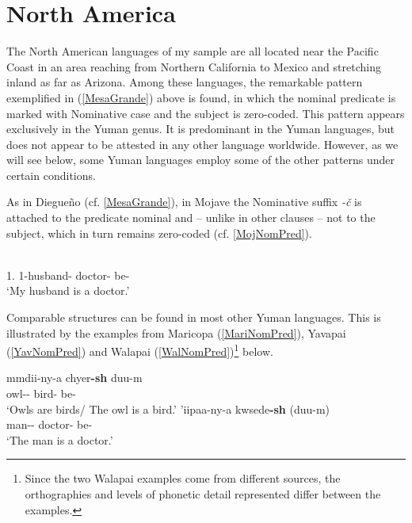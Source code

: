 
\section{North America}\label{NomPredNA}

The North American languages of my sample are all located near the Pacific Coast in an area reaching from Northern California to Mexico and stretching inland as far as Arizona. 
Among these languages, the remarkable pattern exemplified in (\ref{MesaGrande}) above is found, in which the nominal predicate is marked with Nominative case and the subject is zero-coded. 
This pattern appears exclusively in the Yuman genus. 
It is predominant in the Yuman languages, but does not appear to be attested in any other language worldwide. 
However, as we will see below, some Yuman languages employ some of the other patterns under certain conditions.

As in Diegue\~no (cf. \ref{MesaGrande}), in Mojave the Nominative suffix \emph{-\v c} is attached to the predicate nominal and -- unlike in other clauses -- not to the subject, which in turn remains zero-coded (cf. \ref{MojNomPred}).

\begin{exe}\ex\label{MojNomPred}
 \gll {}   \\
1\sg{}.\poss{} 1-husband-\dem{} doctor-\nom{} be-\tns{}\\
\glt `My husband is a doctor.' 
\end{exe}

Comparable structures can be found in most other Yuman languages. This is illustrated by the examples from Maricopa (\ref{MariNomPred}), Yavapai (\ref{YavNomPred}) and Walapai (\ref{WalNomPred})\footnote{Since the two Walapai examples come from different sources, the orthographies and levels of phonetic detail represented differ between the examples.} below.

\begin{exe}
\ex\label{MariNomPred}
\begin{xlist}\ex\gll mmdii-ny-a chyer\textbf{-sh} duu-m\\
owl-\dem{}-\augv{} bird-\nom{} be-\rls{}\\
\glt `Owls are birds/ The owl is a bird.' 
\ex\gll 'iipaa-ny-a kwsede\textbf{-sh} (duu-m)\\
man-\dem{}-\augv{} doctor-\nom{} be-\rls{}\\
\glt `The man is a doctor.'
\end{xlist}
\end{exe}

